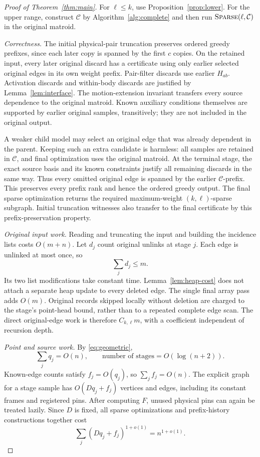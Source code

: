 \documentclass[11pt,a4paper]{article}
\theoremstyle{definition}
\theoremstyle{remark}
\newcommand{\Sparse}{\textsc{Sparse}}
\begin{document}
\begin{proof}[Proof of Theorem~\ref{thm:main}]
For $\ell\leq k$, use Proposition~\ref{prop:lower}.
For the upper range, construct $\mathcal C$ by
Algorithm~\ref{alg:complete} and then run
$\Sparse(\ell,\mathcal C)$ in the original matroid.

\emph{Correctness.}
The initial physical-pair truncation preserves
ordered greedy prefixes, since each later copy
is spanned by the first $c$ copies.
On the retained input, every later original
discard has a certificate using only earlier
selected original edges in its own weight prefix.
Pair-filter discards use earlier $H_{ab}$.
Activation discards and within-body discards
are justified by Lemma~\ref{lem:interface}.
The motion-extension invariant transfers every
source dependence to the original matroid.
Known auxiliary conditions themselves are
supported by earlier original samples, transitively;
they are not included in the original output.

A weaker child model may select an original
edge that was already dependent in the parent.
Keeping such an extra candidate is harmless:
all samples are retained in $\mathcal C$, and
final optimization uses the original matroid.
At the terminal stage, the exact source basis
and its known constraints justify all remaining
discards in the same way.
Thus every omitted original edge is spanned
by the earlier $\mathcal C$-prefix.
This preserves every prefix rank and hence
the ordered greedy output. The final sparse
optimization returns the required maximum-weight
$(k,\ell)$-sparse subgraph.
Initial truncation witnesses also transfer to
the final certificate by this prefix-preservation
property.

\emph{Original input work.}
Reading and truncating the input and building
the incidence lists costs $O(m+n)$.
Let $d_j$ count original unlinks at stage $j$.
Each edge is unlinked at most once, so
\[
 \sum_j d_j\leq m.
\]
Its two list modifications take constant time.
Lemma~\ref{lem:heap-cost} does not attach a
separate heap update to every deleted edge.
The single final array pass adds $O(m)$.
Original records skipped locally without
deletion are charged to the stage's point-head
bound, rather than to a repeated complete
edge scan.
The direct original-edge work is therefore
$C_{k,\ell}m$, with a coefficient independent
of recursion depth.

\emph{Point and source work.}
By \eqref{eq:geometric},
\[
 \sum_jq_j=O(n),\qquad
 \text{number of stages}=O(\log(n+2)).
\]
Known-edge counts satisfy $f_j=O(q_j)$,
so $\sum_jf_j=O(n)$.
The explicit graph for a stage sample has
$O(Dq_j+f_j)$ vertices and edges, including
its constant frames and registered pins.
After computing $F$, unused physical pins
can again be treated lazily.
Since $D$ is fixed, all sparse optimizations
and prefix-history constructions together cost
\[
 \sum_j(Dq_j+f_j)^{1+o(1)}
 =n^{1+o(1)}.
\]


\end{proof}
\end{document}
